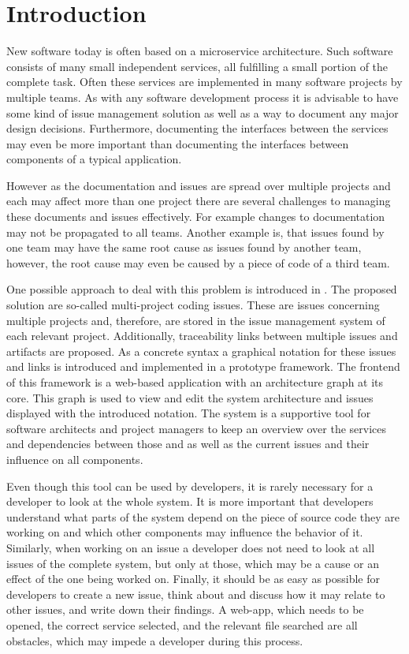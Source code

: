 
\chapter{Introduction}
New software today is often based on a microservice architecture.
Such software consists of many small independent services, all fulfilling a small portion of the complete task.
Often these services are implemented in many software projects by multiple teams.
As with any software development process it is advisable to have some kind of issue management solution as well as a way to document any major design decisions.
Furthermore, documenting the interfaces between the services may even be more important than documenting the interfaces between components of a typical application.

However as the documentation and issues are spread over multiple projects and each may affect more than one project there are several challenges to managing these documents and issues effectively.
For example changes to documentation may not be propagated to all teams. Another example is, that issues found by one team may have the same root cause as issues found by another team, however, the root cause may even be caused by a piece of code of a third team.

One possible approach to deal with this problem is introduced in \cite{Speth2019}.
The proposed solution are so-called multi-project coding issues. These are issues concerning multiple projects and, therefore, are stored in the issue management system of each relevant project. Additionally, traceability links between multiple issues and artifacts are proposed. As a concrete syntax a graphical notation for these issues and links is introduced and implemented in a prototype framework. The frontend of this framework is a web-based application with an architecture graph at its core.
This graph is used to view and edit the system architecture and issues displayed with the introduced notation. 
The system is a supportive tool for software architects and project managers to keep an overview over the services and dependencies between those and as well as the current issues and their influence on all components. 

Even though this tool can be used by developers, it is rarely necessary for a developer to look at the whole system. It is more important that developers understand what parts of the system depend on the piece of source code they are working on and which other components may influence the behavior of it. Similarly, when working on an issue a developer does not need to look at all issues of the complete system, but only at those, which may be a cause or an effect of the one being worked on. Finally, it should be as easy as possible for developers to create a new issue, think about and discuss how it may relate to other issues, and write down their findings. A web-app,  which needs to be opened, the correct service selected, and the relevant file searched are all obstacles, which may impede a developer during this process. 

